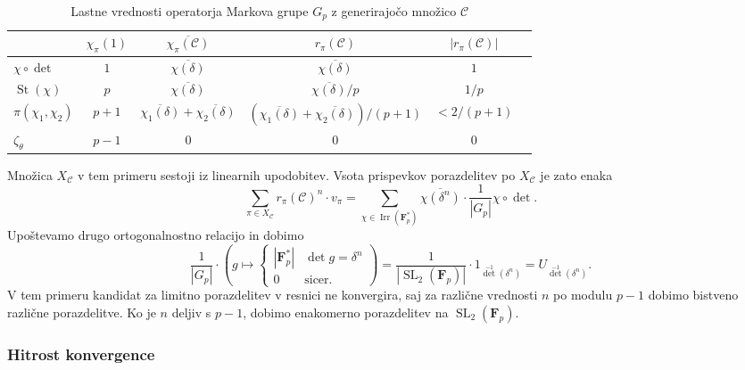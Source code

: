 \documentclass[11pt]{book}
\def\conclass{\mathcal{C}}
\def\FF{\mathbf{F}}
\DeclareMathOperator\Irr{Irr}
\DeclareMathOperator\St{St}
\DeclareMathOperator\SL{SL}
\newcommand{\abs}[1]{\lvert #1 \rvert}
\theoremstyle{definition}
\theoremstyle{zgled}
\theoremstyle{zgledbrezstevilke}
\theoremstyle{odprtproblem}
\theoremstyle{domacanaloga}
\theoremstyle{izrek}
\begin{document}
\begin{table}[ht]
    \centering
    \small
\begin{tabular}{l|*{5}{c}}
    & 
    $\chi_{\pi}(1)$
    &
    $\overline{\chi_{\pi}(\conclass)}$
    &
    $r_{\pi}(\conclass)$
    &
    $\abs{r_{\pi}(\conclass)}$ \\ \hline
    $\chi \circ \det$ & $1$ & $\overline{\chi(\delta)}$ &  $\overline{\chi(\delta)}$ & $1$ \\
    $\St(\chi)$ & $p$ & $\overline{\chi(\delta)}$ & $\overline{\chi(\delta)} / p$ & $1/p$ \\
    $\pi(\chi_1, \chi_2)$ & $p+1$ & $\overline{\chi_1(\delta)} + \overline{\chi_2(\delta)}$ & $(\overline{\chi_1(\delta)} + \overline{\chi_2(\delta)})/(p+1)$ & $< 2/(p+1)$ \\
    $\zeta_{\theta}$ & $p-1$ & $0$ & $0$ & $0$ \\
\end{tabular}
\caption{Lastne vrednosti operatorja Markova grupe $G_p$ z generirajočo množico $\conclass$}
\end{table}

Množica $X_{\conclass}$ v tem primeru sestoji iz linearnih upodobitev. Vsota prispevkov porazdelitev po $X_{\conclass}$ je zato enaka
\[
    \sum_{\pi \in X_{\conclass}} r_{\pi}(\conclass)^n \cdot v_{\pi}
    = \sum_{\chi \in \Irr(\FF_p^*)} \overline{\chi(\delta^{n})} \cdot \frac{1}{|G_p|} \chi \circ \det.
\]
Upoštevamo drugo ortogonalnostno relacijo in dobimo
\[
    \frac{1}{|G_p|} \cdot \left( g \mapsto \begin{cases}
        |\FF_p^*| & \det g = \delta^n \\
        0 & \text{sicer.}
    \end{cases}
    \right)    
    = \frac{1}{|\SL_2(\FF_p)|} \cdot 1_{\det^{-1}(\delta^n)}
    = U_{\det^{-1}(\delta^n)}.
\]
V tem primeru kandidat za limitno porazdelitev v resnici ne konvergira, saj za različne vrednosti $n$ po modulu $p-1$ dobimo bistveno različne porazdelitve. Ko je $n$ deljiv s $p-1$, dobimo enakomerno porazdelitev na $\SL_2(\FF_p)$. 

\subsubsection{Hitrost konvergence}
\end{document}
